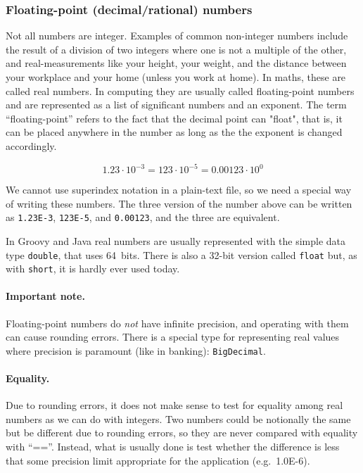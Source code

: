\subsubsection{Floating-point (decimal/rational) numbers}
\label{sec:float-point-decim}

Not all numbers are integer. Examples of common non-integer numbers
include the result of a division of two integers where one is not a
multiple of the other, and real-measurements like your height, your
weight, and the distance between your workplace and your home (unless
you work at home). In maths, these are called real numbers. In
computing they are usually called floating-point numbers and are
represented as a list of significant numbers and an exponent. The term
``floating-point'' refers to the fact that the decimal point can "float",
that is, it can be placed anywhere in the number as long as the the
exponent is changed accordingly. 

$$ 1.23 \cdot 10^{-3} = 123 \cdot 10^{-5} = 0.00123 \cdot 10^0 $$

We cannot use superindex notation in a plain-text file, so we need a
special way of writing these numbers. 
The three version of the number above can be written
as \verb+1.23E-3+, \verb+123E-5+, and \verb+0.00123+, and the three are
equivalent. 

In Groovy and Java real numbers are usually represented with the
simple data type \verb+double+, that uses 64~bits. There is also a
32-bit version called \verb+float+ but, as with \verb+short+, it is
hardly ever used today.

\paragraph{Important note.} 

Floating-point numbers do \emph{not} have infinite precision, and
operating with them can cause rounding errors. There is a special type
for representing real values where precision is paramount (like in
banking): \verb+BigDecimal+. 

\paragraph{Equality. }

Due to rounding errors, it does not make sense to test for equality
among real numbers as we can do with integers. Two numbers could be
notionally the same but be different due to rounding errors, so they
are never compared with equality with ``==''. Instead, what is
usually done is test whether the difference is less that some
precision limit appropriate for the application (e.g.~1.0E-6). 

